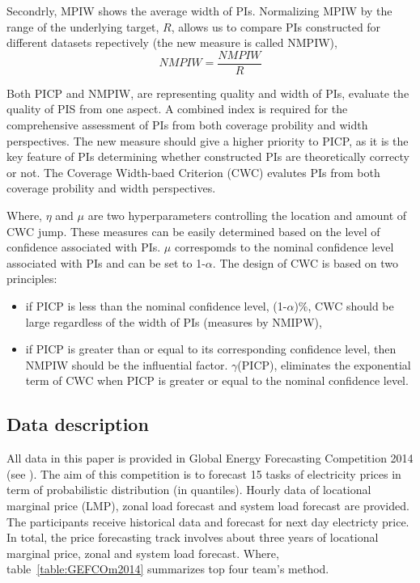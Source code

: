 \documentclass[review]{elsarticle}
\begin{document}
    Secondrly, MPIW shows the average width of PIs. Normalizing MPIW by the range of the underlying target, $R$, allows us to compare PIs constructed for different datasets repectively (the new measure is called NMPIW),
    \begin{equation}
      NMPIW = \frac{NMPIW}{R}
      \label{eq.NMPIW}
    \end{equation}

    Both PICP and NMPIW, are representing quality and width of PIs, evaluate the quality of PIS from one aspect. A combined index is required for the comprehensive assessment of PIs from both coverage probility and width perspectives. The new measure should give a higher priority to PICP, as it is the key feature of PIs determining whether constructed PIs are theoretically correcty or not. The Coverage Width-baed Criterion (CWC) evalutes PIs from both coverage probility and width perspectives.

    Where, $\eta$ and $\mu$ are two hyperparameters controlling the location and amount of CWC jump. These measures can be easily determined based on the level of confidence associated with PIs. $\mu$ correspomds to the nominal confidence level associated with PIs and can be set to 1-$\alpha$. The design of CWC is based on two principles:

    \begin{itemize}
      \item if PICP is less than the nominal confidence level, (1-$\alpha$)$\%$, CWC should be large regardless of the width of PIs (measures by NMIPW),
      \item if PICP is greater than or equal to its corresponding confidence level, then NMPIW should be the influential factor. $\gamma$(PICP), eliminates the exponential term of CWC when PICP is greater or equal to the nominal confidence level.
    \end{itemize}

  \subsection{Data description}
    All data in this paper is provided in Global Energy Forecasting Competition 2014 (see \cite{Hong2016}). The aim of this competition is to forecast 15 tasks of electricity prices in term of probabilistic distribution (in quantiles). Hourly data of locational marginal price (LMP), zonal load forecast and system load forecast are provided. The participants receive historical data and forecast for next day electricty price. In total, the price forecasting track involves about three years of locational marginal price, zonal and system load forecast. Where, table~\ref{table:GEFCOm2014} summarizes top four team's method.
\end{document}
